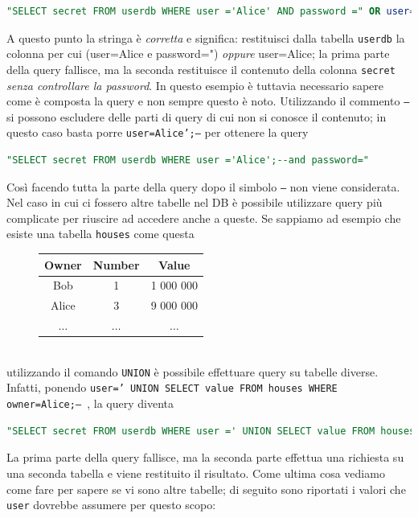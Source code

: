 \begin{lstlisting}[language=sql]
"SELECT secret FROM userdb WHERE user ='Alice' AND password =" OR user='Alice'
\end{lstlisting}
A questo punto la stringa è \textit{corretta} e significa: restituisci dalla tabella \texttt{userdb} la colonna per cui (user=Alice e password=") \textit{oppure} user=Alice; la prima parte della query fallisce, ma la seconda restituisce il contenuto della colonna \texttt{secret} \textit{senza controllare la password}. In questo esempio è tuttavia necessario sapere come è composta la query e non sempre questo è noto. Utilizzando il commento \texttt{--} si possono escludere delle parti di query di cui non si conosce il contenuto; in questo caso basta porre \texttt{user=Alice';--} per ottenere la query
\begin{lstlisting}[language=sql]
"SELECT secret FROM userdb WHERE user ='Alice';--and password="
\end{lstlisting}
Così facendo tutta la parte della query dopo il simbolo \texttt{--} non viene considerata. Nel caso in cui ci fossero altre tabelle nel DB è possibile utilizzare query più complicate per riuscire ad accedere anche a queste. Se sappiamo ad esempio che esiste una tabella \texttt{houses} come questa
\begin{figure}[htbp]
	\centering
	\begin{tabular}{|c|c|c|}
		\hline
		\textbf{Owner} & \textbf{Number} & \textbf{Value} \\
		\hline
		Bob & 1 & 1 000 000 \\
		\hline
		Alice & 3 & 9 000 000 \\
		\hline
		$\dots$ & $\dots$ & $\dots$ \\
		\hline
	\end{tabular}
\end{figure}\\
utilizzando il comando \texttt{UNION} è possibile effettuare query su tabelle diverse. Infatti, ponendo \texttt{user=' UNION SELECT value FROM houses WHERE owner=Alice;-- }, la query diventa
\begin{lstlisting}[language=sql,basicstyle=\scriptsize\ttfamily]
"SELECT secret FROM userdb WHERE user =' UNION SELECT value FROM houses WHERE owner=Alice;-- "
\end{lstlisting}
La prima parte della query fallisce, ma la seconda parte effettua una richiesta su una seconda tabella e viene restituito il risultato. Come ultima cosa vediamo come fare per sapere se vi sono altre tabelle; di seguito sono riportati i valori che \texttt{user} dovrebbe assumere per questo scopo:
